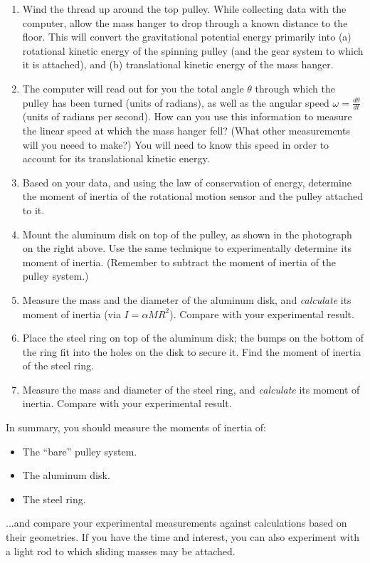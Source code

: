 \documentclass[11pt]{article}
\begin{document}
\begin{enumerate}
\begin{center}
\end{center}
\item Wind the thread up around the top pulley.  While collecting data with
the computer, allow the mass hanger to drop through a known distance to the 
floor.  This will convert the gravitational potential energy primarily 
into (a) rotational kinetic energy of the spinning pulley (and the gear system 
to which it is attached), and (b) translational kinetic energy of the mass 
hanger.  
\item The computer will read out for you the total angle $\theta$ through
which the pulley has been turned (units of radians), as well as the angular
speed $\omega = \frac{d \theta}{d t}$ (units of radians per second).  How can
you use this information to measure the linear speed at which the mass hanger
fell?  (What other measurements will you neeed to make?)  
You will need to know this speed in order to account for its translational 
kinetic energy.
\item Based on your data, and using the law of conservation of energy,  
determine the moment of inertia of the rotational motion sensor and the
pulley attached to it.  
\item Mount the aluminum disk on top of the pulley, as shown in the 
photograph on the right above.  Use the same technique to experimentally
determine its moment of inertia.  (Remember to 
subtract the moment of inertia of the pulley system.)
\item Measure the mass and the diameter of the aluminum disk, and 
{\em{calculate}} its moment of inertia (via $I = \alpha M R^2$).  Compare with your experimental result.
\item Place the steel ring on top of the aluminum disk; the bumps on the
bottom of the ring fit into the holes on the disk to secure it.  Find the
moment of inertia of the steel ring.
\item Measure the mass and diameter of the steel ring, and {\em{calculate}} 
its moment of inertia.  Compare with your experimental result.
\end{enumerate}

\noindent In summary, you should measure the moments of inertia of:
\begin{itemize}
\item The ``bare'' pulley system.
\item The aluminum disk.
\item The steel ring.
\end{itemize}
...and compare your experimental measurements against calculations based on 
their geometries.  If you have the time and interest, you can also experiment 
with a light rod to which sliding masses may be attached.
\end{document}
